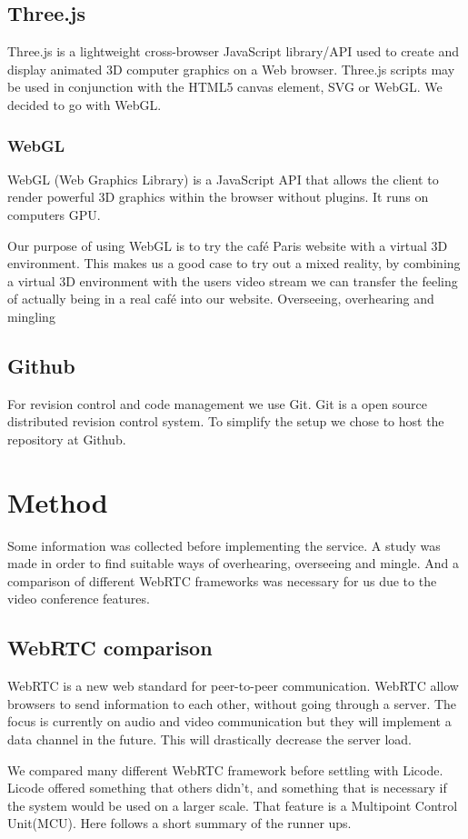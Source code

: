 \documentclass[12pt, titlepage]{article}
\begin{document}
\subsection{Three.js}
Three.js is a lightweight cross-browser JavaScript library/API used to create and display animated 3D computer graphics on a Web browser. Three.js scripts may be used in conjunction with the HTML5 canvas element, SVG or WebGL. We decided to go with WebGL.
\subsubsection{WebGL}
WebGL (Web Graphics Library) is a JavaScript API that allows the client to render powerful 3D graphics within the browser without plugins. It runs on computers GPU.

Our purpose of using WebGL is to try the café Paris website with a virtual 3D environment. This makes us a good case to try out a mixed reality, by combining a virtual 3D environment with the users video stream we can transfer the feeling of actually being in a real café into our website. Overseeing, overhearing and mingling
\subsection{Github}
For revision control and code management we use Git. Git is a open source distributed revision control system. To simplify the setup we chose to host the repository at Github.


\section{Method}
Some information was collected before implementing the service. A study was made in order to find suitable ways of overhearing, overseeing and mingle. And a comparison of different WebRTC frameworks was necessary for us due to the video conference features.
\subsection{WebRTC comparison}
WebRTC is a new web standard for peer-to-peer communication. WebRTC allow browsers to send information to each other, without going through a server. The focus is currently on audio and video communication but they will implement a data channel in the future. This will drastically decrease the server load.

We compared many different WebRTC framework before settling with Licode. Licode offered something that others didn’t, and something that is necessary if the system would be used on a larger scale. That feature is a Multipoint Control Unit(MCU). Here follows a short summary of the runner ups.
\end{document}
